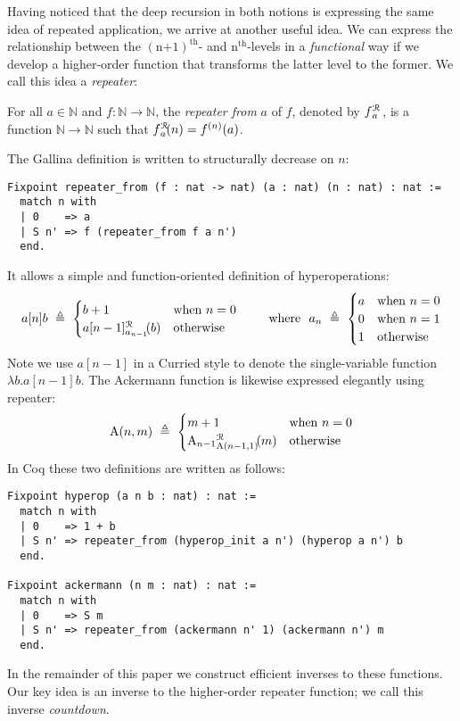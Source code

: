 Having noticed that the deep recursion in both notions is expressing the same idea
of repeated application, we arrive at another useful idea. We can express the relationship
between the $(\text{n+1})^{\text{th}}$- and $\text{n}^{\text{th}}$-levels in
a \emph{functional} way if we develop a higher-order function that transforms the latter level
to the former.  We call this idea a \emph{repeater}:
\begin{defn}
For all $a\in \mathbb{N}$ and $f: \mathbb{N}\to \mathbb{N}$, the \emph{repeater from} $a$ of $f$, denoted by $\rf{f}{a}$ , is a function $\mathbb{N}\to \mathbb{N}$ such that $\rf{f}{a}(n) = f^{(n)}(a)$.
\end{defn}
The Gallina definition is written to structurally decrease on $n$:
\begin{lstlisting}
Fixpoint repeater_from (f : nat -> nat) (a : nat) (n : nat) : nat :=
  match n with
  | 0    => a
  | S n' => f (repeater_from f a n')
  end.
\end{lstlisting}
 It allows a simple and function-oriented definition of hyperoperations:
\begin{equation*}
a[n]b ~ \triangleq ~ \begin{cases}
b + 1 & \text{when } n = 0 \\
\rf{a[n-1]}{a_{n-1}}(b) & \text{otherwise}
\end{cases}
\qquad \text{ where } \ a_n ~ \triangleq ~ \begin{cases}
a & \text{when } n = 0 \\
0 & \text{when } n = 1 \\
1 & \text{otherwise}
\end{cases}
\end{equation*}
Note we use $a[n-1]$ in a Curried style to denote the single-variable function $\lambda b.a[n-1]b$.
The Ackermann function is likewise expressed elegantly using repeater:
\begin{equation*}
\Ack(n,m) ~ \triangleq ~ \begin{cases}
m + 1 & \text{when } n = 0 \\
\rf{\Ack_{n-1}}{\Ack(n-1,1)}(m) & \text{otherwise}
\end{cases}
\end{equation*}
In Coq these two definitions are written as follows:
\begin{lstlisting}
Fixpoint hyperop (a n b : nat) : nat :=
  match n with
  | 0    => 1 + b
  | S n' => repeater_from (hyperop_init a n') (hyperop a n') b
  end.

Fixpoint ackermann (n m : nat) : nat :=
  match n with
  | 0    => S m
  | S n' => repeater_from (ackermann n' 1) (ackermann n') m
  end.
\end{lstlisting}
In the remainder of this paper we construct efficient inverses to these
functions.  Our key idea is an inverse to the higher-order repeater function; we call this inverse \emph{countdown}.

